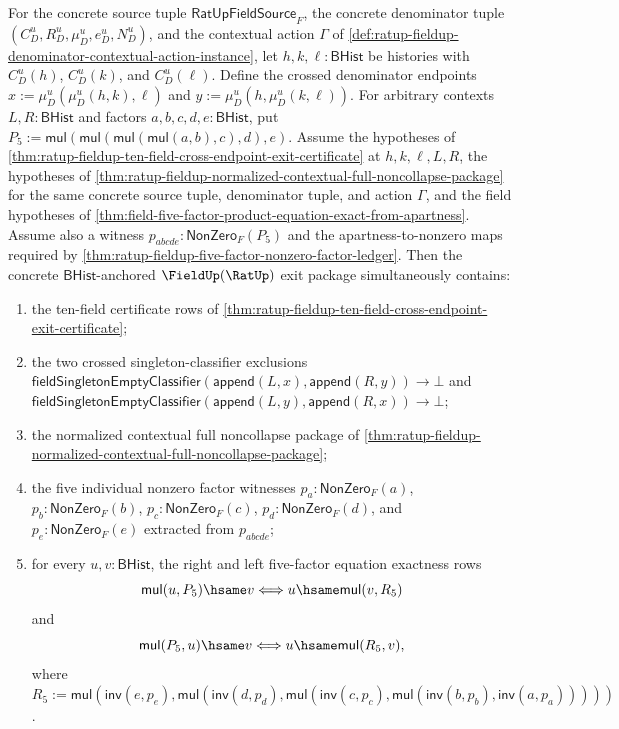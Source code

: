 \begin{theorem}
\label{thm:ratup-fieldup-contextual-cross-endpoint-nondegenerate-exit-package}
For the concrete source tuple $\mathsf{RatUpFieldSource}_F$, the concrete
denominator tuple $(C_D^u,R_D^u,\mu_D^u,e_D^u,N_D^u)$, and the contextual action
$\Gamma$ of \autoref{def:ratup-fieldup-denominator-contextual-action-instance},
let $h,k,\ell:\mathsf{BHist}$ be histories with $C_D^u(h)$, $C_D^u(k)$, and
$C_D^u(\ell)$. Define the crossed denominator endpoints
$x:=\mu_D^u(\mu_D^u(h,k),\ell)$ and
$y:=\mu_D^u(h,\mu_D^u(k,\ell))$. For arbitrary contexts
$L,R:\mathsf{BHist}$ and factors $a,b,c,d,e:\mathsf{BHist}$, put
$P_5:=\mathsf{mul}(\mathsf{mul}(\mathsf{mul}(\mathsf{mul}(a,b),c),d),e)$.
Assume the hypotheses of
\autoref{thm:ratup-fieldup-ten-field-cross-endpoint-exit-certificate} at
$h,k,\ell,L,R$, the hypotheses of
\autoref{thm:ratup-fieldup-normalized-contextual-full-noncollapse-package} for
the same concrete source tuple, denominator tuple, and action $\Gamma$, and the
field hypotheses of
\autoref{thm:field-five-factor-product-equation-exact-from-apartness}. Assume
also a witness $p_{abcde}:\mathsf{NonZero}_F(P_5)$ and the apartness-to-nonzero maps required by
\autoref{thm:ratup-fieldup-five-factor-nonzero-factor-ledger}. Then the concrete
$\mathsf{BHist}$-anchored $\FieldUp(\RatUp)$ exit package simultaneously
contains:
\begin{enumerate}
  \item the ten-field certificate rows of
  \autoref{thm:ratup-fieldup-ten-field-cross-endpoint-exit-certificate};
  \item the two crossed singleton-classifier exclusions
  $\mathsf{fieldSingletonEmptyClassifier}(\mathsf{append}(L,x),\mathsf{append}(R,y))
  \to\bot$ and
  $\mathsf{fieldSingletonEmptyClassifier}(\mathsf{append}(L,y),\mathsf{append}(R,x))
  \to\bot$;
  \item the normalized contextual full noncollapse package of
  \autoref{thm:ratup-fieldup-normalized-contextual-full-noncollapse-package};
  \item the five individual nonzero factor witnesses
  $p_a:\mathsf{NonZero}_F(a)$, $p_b:\mathsf{NonZero}_F(b)$,
  $p_c:\mathsf{NonZero}_F(c)$, $p_d:\mathsf{NonZero}_F(d)$, and
  $p_e:\mathsf{NonZero}_F(e)$ extracted from $p_{abcde}$;
  \item for every $u,v:\mathsf{BHist}$, the right and left five-factor equation
  exactness rows
  $$
  \mathsf{mul}(u,P_5)\hsame v
  \Longleftrightarrow
  u\hsame\mathsf{mul}(v,R_5)
  $$
  and
  $$
  \mathsf{mul}(P_5,u)\hsame v
  \Longleftrightarrow
  u\hsame\mathsf{mul}(R_5,v),
  $$
  where
  $R_5:=\mathsf{mul}(\mathsf{inv}(e,p_e),\mathsf{mul}(\mathsf{inv}(d,p_d),
  \mathsf{mul}(\mathsf{inv}(c,p_c),\mathsf{mul}(\mathsf{inv}(b,p_b),
  \mathsf{inv}(a,p_a)))))$.
\end{enumerate}
\end{theorem}
